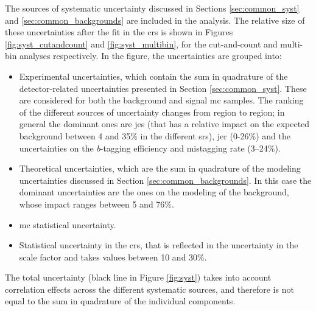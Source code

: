 The sources of systematic uncertainty discussed in Sections \ref{sec:common_syst} and \ref{sec:common_backgrounds} are included in the analysis.
The relative size of these uncertainties after the fit in the \glspl{cr} is shown in Figures \ref{fig:syst_cutandcount} and \ref{fig:syst_multibin},
for the cut-and-count and multi-bin analyses respectively. 
In the figure, the uncertainties are grouped into:
\begin{itemize}
\item Experimental uncertainties, which contain the sum in quadrature of the detector-related uncertainties 
presented in Section \ref{sec:common_syst}. These are considered for both the background and signal \gls{mc} samples.
The ranking of the different sources of uncertainty changes from region to region; in general the dominant ones are \gls{jes} (that has a 
relative impact on the expected background between 4 and 35\% in the different \glspl{sr}), \gls{jer} (0-26\%) and the uncertainties on the 
\textit{b}-tagging efficiency and mistagging rate (3--24\%).

\item Theoretical uncertainties, which are the sum in quadrature of the modeling uncertainties discussed in Section \ref{sec:common_backgrounds}.
In this case the dominant uncertainties are the ones on the modeling of the \ttbar background, whose impact ranges between 5 and 76\%.

\item \gls{mc} statistical uncertainty.

\item Statistical uncertainty in the \glspl{cr}, that is reflected in the uncertainty in the \ttbar scale factor and takes values between 10 and 30\%.

\end{itemize}

The total uncertainty (black line in Figure \ref{fig:syst}) takes into account correlation effects across the different systematic sources, 
and therefore is not equal to the sum in quadrature of the individual components. 

